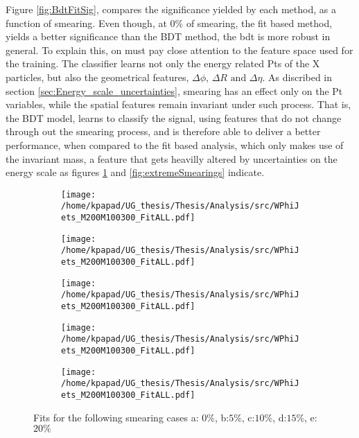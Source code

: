 Figure \ref{fig:BdtFitSig}, compares the significance yielded by each method, as a function of smearing. 
Even though, at \(0\%\) of smearing, the fit based method, yields a better significance than the BDT method, the bdt is more robust in general. To explain this, on must pay close attention to the feature space used for the training. The classifier learns not only the energy related Pts of the X particles, but also the geometrical features, \(\Delta\phi\text{, }\Delta R\text{ and }\Delta\eta\). As discribed in section \ref{sec:Energy_scale_uncertainties}, smearing has an effect only on the Pt variables, while the spatial features remain invariant under such process. That is, the BDT model, learns to classify the signal, using features that do not change through out the smearing process, and is therefore able to deliver a better performance, when compared to the fit based analysis, which only makes use of the invariant mass, a feature that gets heavilly altered by uncertainties on the energy scale as figures \ref{fig:fits} and \ref{fig:extremeSmearings} indicate. 

\begin{figure}[hbpt]
\centering
\begin{subfigure}{0.45\textwidth}
\centering
\texttt{[image: /home/kpapad/UG\_thesis/Thesis/Analysis/src/WPhiJets\_M200M100300\_FitALL.pdf]}
\caption{}
\end{subfigure}
\begin{subfigure}{0.45\textwidth}
\centering
\texttt{[image: /home/kpapad/UG\_thesis/Thesis/Analysis/src/WPhiJets\_M200M100300\_FitALL.pdf]}
\caption{}
\end{subfigure}

\begin{subfigure}{0.45\textwidth}
\centering
\texttt{[image: /home/kpapad/UG\_thesis/Thesis/Analysis/src/WPhiJets\_M200M100300\_FitALL.pdf]}
\caption{}
\end{subfigure}
\begin{subfigure}{0.45\textwidth}
\centering
\texttt{[image: /home/kpapad/UG\_thesis/Thesis/Analysis/src/WPhiJets\_M200M100300\_FitALL.pdf]}
\caption{}
\end{subfigure}

\begin{subfigure}{0.45\textwidth}
\centering
\texttt{[image: /home/kpapad/UG\_thesis/Thesis/Analysis/src/WPhiJets\_M200M100300\_FitALL.pdf]}
\caption{}
\end{subfigure}
\caption{Fits for the following smearing cases a: $0\%$, b:$5\%$, c:$10\%$, d:$15\%$, e:$20\%$}
\label{fig:fits}
\end{figure}

